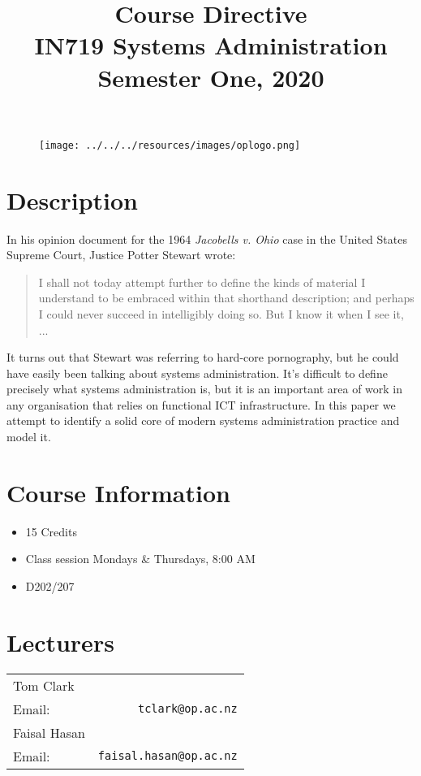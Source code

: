 \documentclass{article}
\begin{document}
\begin{figure}
\texttt{[image: ../../../resources/images/oplogo.png]}
\end{figure}

\title{Course Directive\\IN719 Systems Administration \\Semester One, 2020}
\date{}
\maketitle

\section*{Description}
In his opinion document for the 1964 \textit{Jacobells v. Ohio} case in the United States Supreme Court, Justice Potter Stewart wrote:
\begin{quote}
I shall not today attempt further to define the kinds of material I understand to be embraced within that shorthand description; and perhaps I could never succeed in intelligibly doing so. But I know it when I see it, ...
\end{quote}
It turns out that Stewart was referring to hard-core pornography, but he could have easily been talking about systems administration. It's difficult to define precisely what systems administration is, but it is an important area of work in any organisation that relies on functional ICT infrastructure. In this paper we attempt to identify a solid core of modern systems administration practice and model it.



\section*{Course Information}
\begin{itemize}
  \item 15 Credits
  \item Class session Mondays \& Thursdays, 8:00 AM
  \item D202/207
\end{itemize}

\section*{Lecturers}
\begin{tabular}{lr}

  Tom Clark &    \\
     Email: & \texttt{tclark@op.ac.nz} \\
   Faisal Hasan &    \\
     Email: & \texttt{faisal.hasan@op.ac.nz} \\
     
\end{tabular}
\end{document}
